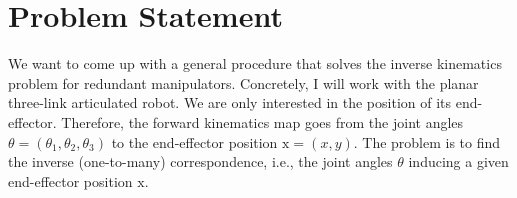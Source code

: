 \section{Problem Statement}
%
%
We want to come up with a general procedure that solves the inverse kinematics
problem for redundant manipulators. Concretely, I will work with the planar
three-link articulated robot. We are only interested in the position of its
end-effector. Therefore, the forward kinematics map goes from the joint angles
$\theta = (\theta_1, \theta_2, \theta_3)$ to the end-effector position
$\mathrm{x} = (x,y)$. The problem is to find the inverse (one-to-many)
correspondence, i.e., the joint angles $\theta$ inducing a given end-effector
position $\mathrm{x}$.
